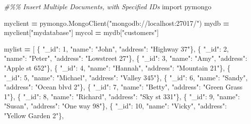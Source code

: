 \documentclass[
]{book}
\newenvironment{Shaded}{\begin{snugshade}}{\end{snugshade}}
\newcommand{\CommentTok}[1]{\textcolor[rgb]{0.56,0.35,0.01}{\textit{#1}}}
\newcommand{\DecValTok}[1]{\textcolor[rgb]{0.00,0.00,0.81}{#1}}
\newcommand{\ImportTok}[1]{#1}
\newcommand{\NormalTok}[1]{#1}
\newcommand{\OperatorTok}[1]{\textcolor[rgb]{0.81,0.36,0.00}{\textbf{#1}}}
\newcommand{\StringTok}[1]{\textcolor[rgb]{0.31,0.60,0.02}{#1}}
\begin{document}
\begin{Shaded}
\begin{Highlighting}[]
\CommentTok{\#\%\% Insert Multiple Documents, with Specified IDs}
\ImportTok{import}\NormalTok{ pymongo}

\NormalTok{myclient }\OperatorTok{=}\NormalTok{ pymongo.MongoClient(}\StringTok{"mongodb://localhost:27017/"}\NormalTok{)}
\NormalTok{mydb }\OperatorTok{=}\NormalTok{ myclient[}\StringTok{"mydatabase"}\NormalTok{]}
\NormalTok{mycol }\OperatorTok{=}\NormalTok{ mydb[}\StringTok{"customers"}\NormalTok{]}

\NormalTok{mylist }\OperatorTok{=}\NormalTok{ [}
\NormalTok{  \{ }\StringTok{"\_id"}\NormalTok{: }\DecValTok{1}\NormalTok{, }\StringTok{"name"}\NormalTok{: }\StringTok{"John"}\NormalTok{, }\StringTok{"address"}\NormalTok{: }\StringTok{"Highway 37"}\NormalTok{\},}
\NormalTok{  \{ }\StringTok{"\_id"}\NormalTok{: }\DecValTok{2}\NormalTok{, }\StringTok{"name"}\NormalTok{: }\StringTok{"Peter"}\NormalTok{, }\StringTok{"address"}\NormalTok{: }\StringTok{"Lowstreet 27"}\NormalTok{\},}
\NormalTok{  \{ }\StringTok{"\_id"}\NormalTok{: }\DecValTok{3}\NormalTok{, }\StringTok{"name"}\NormalTok{: }\StringTok{"Amy"}\NormalTok{, }\StringTok{"address"}\NormalTok{: }\StringTok{"Apple st 652"}\NormalTok{\},}
\NormalTok{  \{ }\StringTok{"\_id"}\NormalTok{: }\DecValTok{4}\NormalTok{, }\StringTok{"name"}\NormalTok{: }\StringTok{"Hannah"}\NormalTok{, }\StringTok{"address"}\NormalTok{: }\StringTok{"Mountain 21"}\NormalTok{\},}
\NormalTok{  \{ }\StringTok{"\_id"}\NormalTok{: }\DecValTok{5}\NormalTok{, }\StringTok{"name"}\NormalTok{: }\StringTok{"Michael"}\NormalTok{, }\StringTok{"address"}\NormalTok{: }\StringTok{"Valley 345"}\NormalTok{\},}
\NormalTok{  \{ }\StringTok{"\_id"}\NormalTok{: }\DecValTok{6}\NormalTok{, }\StringTok{"name"}\NormalTok{: }\StringTok{"Sandy"}\NormalTok{, }\StringTok{"address"}\NormalTok{: }\StringTok{"Ocean blvd 2"}\NormalTok{\},}
\NormalTok{  \{ }\StringTok{"\_id"}\NormalTok{: }\DecValTok{7}\NormalTok{, }\StringTok{"name"}\NormalTok{: }\StringTok{"Betty"}\NormalTok{, }\StringTok{"address"}\NormalTok{: }\StringTok{"Green Grass 1"}\NormalTok{\},}
\NormalTok{  \{ }\StringTok{"\_id"}\NormalTok{: }\DecValTok{8}\NormalTok{, }\StringTok{"name"}\NormalTok{: }\StringTok{"Richard"}\NormalTok{, }\StringTok{"address"}\NormalTok{: }\StringTok{"Sky st 331"}\NormalTok{\},}
\NormalTok{  \{ }\StringTok{"\_id"}\NormalTok{: }\DecValTok{9}\NormalTok{, }\StringTok{"name"}\NormalTok{: }\StringTok{"Susan"}\NormalTok{, }\StringTok{"address"}\NormalTok{: }\StringTok{"One way 98"}\NormalTok{\},}
\NormalTok{  \{ }\StringTok{"\_id"}\NormalTok{: }\DecValTok{10}\NormalTok{, }\StringTok{"name"}\NormalTok{: }\StringTok{"Vicky"}\NormalTok{, }\StringTok{"address"}\NormalTok{: }\StringTok{"Yellow Garden 2"}\NormalTok{\},}

\end{Highlighting}
\end{Shaded}
\end{document}
